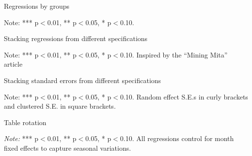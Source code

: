 \documentclass[11pt]{article}
\numberwithin{table}{section}   %
\begin{document}
\begin{table}[!htbp]
    \caption{Regressions by groups} \label{reg4}
        \begin{center}
            \resizebox{1\textwidth}{!}{
                    
            }
        \end{center}
    \small{Note:  *** p$<$0.01, ** p$<$0.05, * p$<$0.10.} 
\end{table}


\clearpage


\begin{table}[!htbp]
 \caption{Stacking regressions from different specifications} \label{reg5}
\centering


\vspace{3pt}
\small{Note:  *** p$<$0.01, ** p$<$0.05, * p$<$0.10. Inspired by the ``Mining Mita'' article \citep{Dell2010}} 
\end{table}



\vspace{5em}

\begin{table}[!htbp]
 \caption{Stacking standard errors from different specifications} \label{reg6}
\begin{center}

 \end{center}

\small{Note:  *** p$<$0.01, ** p$<$0.05, * p$<$0.10. Random effect S.E.s in curly brackets and clustered S.E. in square brackets.} 
\end{table}


\clearpage


\begin{sidewaystable}[!htbp]  %

\caption{Table rotation} \label{reg7}

\resizebox{1\textwidth}{!}{  %
	  
	   }

\vspace{1em}

\small{\textit{Note:}  *** p$<$0.01, ** p$<$0.05, * p$<$0.10. All regressions control for month fixed effects to capture seasonal variations.} 
\end{sidewaystable}
\end{document}
